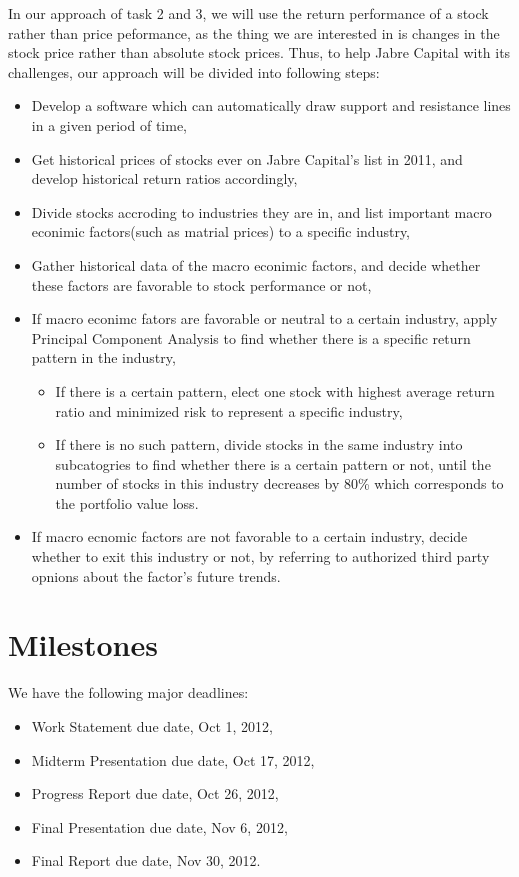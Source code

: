 \documentclass[12pt,letterpaper]{article}
\theoremstyle{definition}
\begin{document}
In our approach of task 2 and 3, we will use the return performance of a stock rather than price peformance, as the thing we are interested in is changes in the stock price rather than absolute stock prices.
Thus, to help Jabre Capital with its challenges, our approach will be divided into following steps:
\begin{itemize}
\item Develop a software which can automatically draw support and resistance lines in a given period of time,
\item Get historical prices of stocks ever on Jabre Capital's list in 2011, and develop historical return ratios accordingly,
\item Divide stocks accroding to industries they are in, and list important macro econimic factors(such as matrial prices) to a specific industry,
\item Gather historical data of the macro econimic factors, and decide whether these factors are favorable to stock performance or not,
\item If macro econimc fators are favorable or neutral to a certain industry, apply Principal Component Analysis to find whether there is a specific return pattern in the industry,
	\begin{itemize}
	\item If there is a certain pattern, elect one stock with highest average return ratio and minimized risk to represent a specific industry,
	\item If there is no such pattern, divide stocks in the same industry into subcatogries to find whether there is a certain pattern or not, until the number of stocks in this industry decreases by 80\% which corresponds to the portfolio value loss.
	\end{itemize}
\item If macro ecnomic factors are not favorable to a certain industry, decide whether to exit this industry or not, by referring to authorized third party opnions about the factor's future trends.
\end{itemize} 

\section{Milestones}
We have the following major deadlines:
\begin{itemize}
    \item Work Statement due date, Oct 1, 2012,
    \item Midterm Presentation due date, Oct 17, 2012,
    \item Progress Report due date, Oct 26, 2012,
    \item Final Presentation due date, Nov 6, 2012,
    \item Final Report due date, Nov 30, 2012.
\end{itemize}
\end{document}

